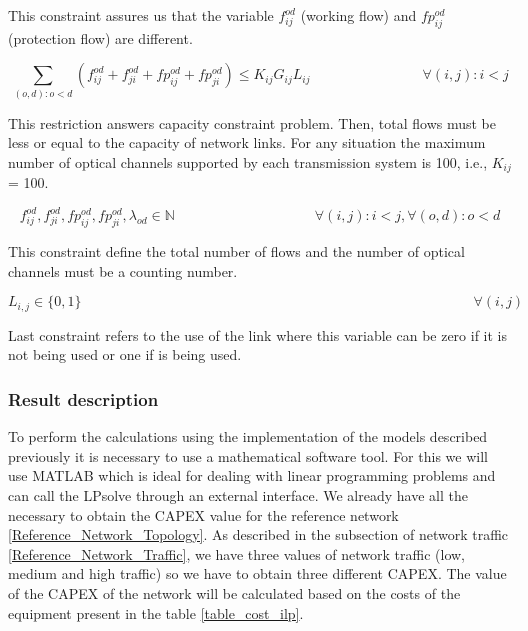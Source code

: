 This constraint assures us that the variable $f_{ij}^{od}$ (working flow) and $fp_{ij}^{od}$ (protection flow) are different.

\begin{equation}
\sum_{(o,d):o<d} \left(f_{ij}^{od} + f_{ji}^{od} + fp_{ij}^{od} + fp_{ji}^{od}\right) \leq K_{ij} G_{ij} L_{ij} \qquad \qquad \qquad \qquad
\forall(i,j) : i < j
\label{ILPTransp4}
\end{equation}

This restriction answers capacity constraint problem. Then, total flows must be less or equal to the capacity of network links. For any situation the maximum number of optical channels supported by each transmission system is 100, i.e., $K_{ij}$ = 100.

\begin{equation}
f_{ij}^{od} , f_{ji}^{od} , fp_{ij}^{od} , fp_{ji}^{od} , \lambda_{od} \in \mathbb{N}   \qquad \qquad \qquad \qquad \qquad
\forall(i,j) : i < j, \forall(o,d) : o < d
\label{ILPTransp5}
\end{equation}

This constraint define the total number of flows and the number of optical channels must be a counting number.

\begin{equation}
L_{i,j} \in \{0,1\} \qquad \qquad \qquad \qquad \qquad \qquad \qquad \qquad \qquad \qquad \qquad \qquad \qquad \qquad
\forall(i,j)
\label{ILPTranspL1}
\end{equation}

Last constraint refers to the use of the link where this variable can be zero if it is not being used or one if is being used.\\


\subsubsection{Result description}

To perform the calculations using the implementation of the models described previously it is necessary to use a mathematical software tool. For this we will use MATLAB which is ideal for dealing with linear programming problems and can call the LPsolve through an external interface. We already have all the necessary to obtain the CAPEX value for the reference network \ref{Reference_Network_Topology}. As described in the subsection of network traffic \ref{Reference_Network_Traffic}, we have three values of network traffic (low, medium and high traffic) so we have to obtain three different CAPEX. The value of the CAPEX of the network will be calculated based on the costs of the equipment present in the table \ref{table_cost_ilp}.\\

